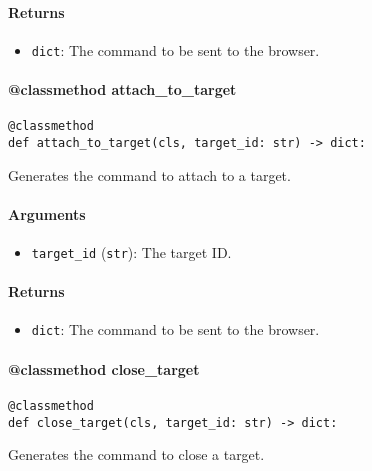 \documentclass{article}
\begin{document}
\paragraph{Returns}

\begin{itemize}
    \item \lstinline[style=pythonstyle]|dict|: The command to be sent to the browser.
\end{itemize}

\paragraph{@classmethod attach\_to\_target}

\begin{lstlisting}[style=pythonstyle]
@classmethod
def attach_to_target(cls, target_id: str) -> dict:
\end{lstlisting}

\noindent Generates the command to attach to a target.

\paragraph{Arguments}

\begin{itemize}
    \item \lstinline[style=pythonstyle]|target_id| (\lstinline[style=pythonstyle]|str|): The target ID.
\end{itemize}

\paragraph{Returns}

\begin{itemize}
    \item \lstinline[style=pythonstyle]|dict|: The command to be sent to the browser.
\end{itemize}

\paragraph{@classmethod close\_target}

\begin{lstlisting}[style=pythonstyle]
@classmethod
def close_target(cls, target_id: str) -> dict:
\end{lstlisting}

\noindent Generates the command to close a target.
\end{document}
